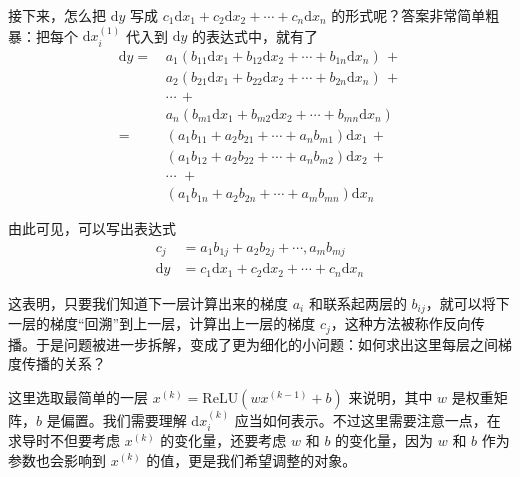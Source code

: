 接下来，怎么把 $\mathrm{d}y$ 写成 $c_1 \mathrm{d}x_1 + c_2 \mathrm{d}x_2 + \cdots + c_n \mathrm{d}x_n$ 的形式呢？答案非常简单粗暴：把每个 $\mathrm{d}x^{(1)}_i$ 代入到 $\mathrm{d}y$ 的表达式中，就有了
\[
    \begin{aligned}
        \mathrm{d}y =\, & a_1 (b_{11} \mathrm{d}x_1 + b_{12} \mathrm{d}x_2 + \cdots + b_{1n} \mathrm{d}x_n) \, + \\
                        & a_2 (b_{21} \mathrm{d}x_1 + b_{22} \mathrm{d}x_2 + \cdots + b_{2n} \mathrm{d}x_n) \, + \\
                        & \cdots \, +                                                                            \\
                        & a_n (b_{m1} \mathrm{d}x_1 + b_{m2} \mathrm{d}x_2 + \cdots + b_{mn} \mathrm{d}x_n)      \\
        =\,             & (a_1 b_{11} + a_2 b_{21} + \cdots + a_n b_{m1}) \mathrm{d}x_1 \,+                      \\
                        & (a_1 b_{12} + a_2 b_{22} + \cdots + a_n b_{m2}) \mathrm{d}x_2 \,+                      \\
                        & \cdots \, \,+                                                                          \\
                        & (a_1 b_{1n} + a_2 b_{2n} + \cdots + a_m b_{mn}) \mathrm{d}x_n
    \end{aligned}
\]

由此可见，可以写出表达式
\[
    \begin{aligned}
        c_j         & = a_1 b_{1j} + a_2 b_{2j} + \cdots, a_m b_{mj}                       \\
        \mathrm{d}y & = c_1 \mathrm{d}x_1 + c_2 \mathrm{d}x_2 + \cdots + c_n \mathrm{d}x_n
    \end{aligned}
\]

这表明，只要我们知道下一层计算出来的梯度 $a_i$ 和联系起两层的 $b_{ij}$，就可以将下一层的梯度“回溯”到上一层，计算出上一层的梯度 $c_j$，这种方法被称作反向传播。于是问题被进一步拆解，变成了更为细化的小问题：如何求出这里每层之间梯度传播的关系？

这里选取最简单的一层 $x^{(k)} = \text{ReLU}(w x^{(k-1)} + b)$ 来说明，其中 $w$ 是权重矩阵，$b$ 是偏置。我们需要理解 $\mathrm{d}x^{(k)}_i$ 应当如何表示。不过这里需要注意一点，在求导时不但要考虑 $x^{(k)}$ 的变化量，还要考虑 $w$ 和 $b$ 的变化量，因为 $w$ 和 $b$ 作为参数也会影响到 $x^{(k)}$ 的值，更是我们希望调整的对象。

